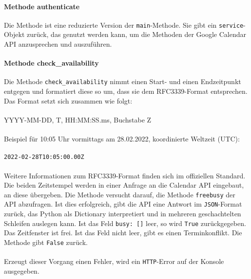             
            \paragraph{Methode authenticate}
                Die Methode ist eine reduzierte Version der \verb|main|-Methode. Sie gibt ein \verb|service|-Objekt zurück, das genutzt werden kann, um die Methoden der Google Calendar API anzusprechen und auszuführen. 
      

            \paragraph{Methode check\_availability}
                Die Methode \verb|check_availability| nimmt einen Start- und einen Endzeitpunkt entgegen und formatiert diese so um, dass sie dem RFC3339-Format entsprechen. Das Format setzt sich zusammen wie folgt: \\
                \\
                YYYY-MM-DD, \glq T\grq, HH:MM:SS.ms, Buchstabe \glq Z\grq \\
                \\
                Beispiel für 10:05 Uhr vormittags am 28.02.2022, koordinierte Weltzeit (UTC): \\
                \\
                \verb/2022-02-28T10:05:00.00Z/ \\
                \\
                Weitere Informationen zum RFC3339-Format finden sich im offiziellen Standard. \cite{date_time} \\

                Die beiden Zeitstempel werden in einer Anfrage an die Calendar API eingebaut, an diese übergeben. Die Methode versucht darauf, die Methode \verb|freebusy| der API abzufragen. Ist dies erfolgreich, gibt die API eine Antwort im \verb|JSON|-Format zurück, das Python als Dictionary interpretiert und in mehreren geschachtelten Schleifen auslegen kann. Ist das Feld \verb|busy: []| leer, so wird \verb|True| zurückgegeben. Das Zeitfenster ist frei. Ist das Feld nicht leer, gibt es einen Terminkonflikt. Die Methode gibt \verb|False| zurück. \\
                \\
                Erzeugt dieser Vorgang einen Fehler, wird ein \verb|HTTP|-Error auf der Konsole ausgegeben. 


